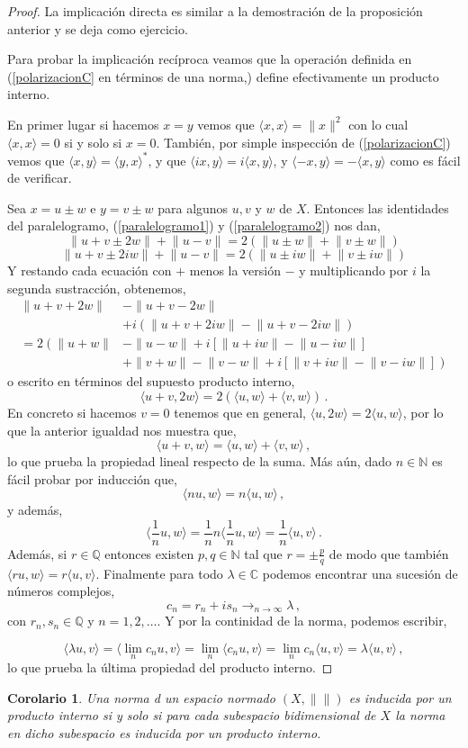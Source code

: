 \documentclass[12pt]{book}
\newtheorem{coro}{Corolario}[chapter]
\def\NN{\mathbb{N}}
\def\QQ{\mathbb{Q}}
\def\CC{\mathbb{C}}
\newcommand{\norm}[1]{\lVert #1\rVert }
\newcommand{\lin}[1]{\langle #1 \rangle}
\newcommand{\Lin}[1]{\langle #1 \rangle}
\begin{document}
\begin{proof}
La implicación directa es similar a  la demostración de la proposición anterior y se deja como ejercicio.
 
 Para probar la implicación recíproca veamos que la operación definida en (\ref{polarizacionC} en términos de una norma,) define efectivamente un producto interno.
 
 En primer lugar si hacemos $x=y$ vemos que $\lin{x,x}=\norm{x}^2$ con lo cual $\lin{x,x}=0$ si y solo si $x=0$. También, por simple inspección de (\ref{polarizacionC}) vemos que $\lin{x,y}=\lin{y,x}^*$, y que $\lin{ix,y}=i\lin{x,y}$, y $\lin{-x,y}=-\lin{x,y}$  como es fácil de verificar.
 
 Sea $x=u\pm w$ e $y=v\pm w$ para algunos $u,v$ y $w$ de $X$. Entonces las identidades del paralelogramo, (\ref{paralelogramo1}) y (\ref{paralelogramo2}) nos dan,
 $$\norm{u+v\pm 2w} +\norm{u-v}=2\left(\norm{u\pm w}+\norm{v\pm w}\right)$$$$\norm{u+v\pm 2iw} +\norm{u-v}=2\left(\norm{u\pm iw}+\norm{v\pm iw}\right)$$
Y restando cada ecuación con $+$ menos la versión $-$ y multiplicando por $i$ la segunda sustracción, obtenemos,
\begin{align*}
\norm{u+v +2w}&-\norm{u+v-2w}\\
&+i\left(\norm{u+v+2iw}-\norm{u+v-2iw}\right)\\
=2\left( \norm{u+w}\right.&\left.-\norm{u-w}+i\left[\norm{u+iw}-\norm{u-iw}\right]\right.\\
&\left.+\norm{v+w}-\norm{v-w}+i\left[\norm{v+iw}-\norm{v-iw}\right]\right)
\end{align*}
 o escrito en términos del supuesto producto interno,
 $$\lin{u+v,2w}=2\left(\lin{u,w}+\lin{v,w}\right)\,.$$
 En concreto si hacemos  $v=0$ tenemos que en general, $\lin{u,2w}=2\lin{u,w}$, por lo que la anterior igualdad nos muestra que,
 $$\lin{u+v,w}=\lin{u,w}+\lin{v,w}\,,$$
 lo que prueba la propiedad lineal respecto de la suma. Más aún, dado $n\in\NN$ es fácil probar por inducción que,
 $$\lin{nu,w}=n\lin{u,w}\,,$$
y  además,
$$\Lin{\frac{1}{n}u,w}=\frac{1}{n} n\Lin{\frac{1}{n}u,w}=\frac{1}{n}\lin{u,v}\,.$$
Además, si $r\in \QQ$ entonces existen $p,q\in\NN$ tal que $r=\pm\frac{p}{q}$ de modo que también $\lin{ru,w}=r\lin{u,v}$. Finalmente para todo $\lambda\in\CC$ podemos encontrar una sucesión de números complejos,
$$c_n=r_n+is_n\mathop{\longrightarrow}_{n\to\infty} \lambda\,,$$
 con $r_n,s_n\in\QQ$ y $n=1,2,\dots$. Y por la continidad de la norma, podemos escribir,


$$\lin{\lambda u,v}=\Lin{\lim_n  c_n u,v}=\lim_n\lin{c_n u,v}=\lim_n  c_n\lin{u,v}=\lambda\lin{u,v}\,,$$
lo que prueba la última propiedad del producto interno. 
  
\end{proof} 
\begin{coro} Una norma d un espacio normado $(X,\norm{})$ es inducida por un producto interno si y solo si para cada subespacio bidimensional de $X$ la norma  en dicho subespacio es inducida por un producto interno.
\end{coro}
 
\end{document}
